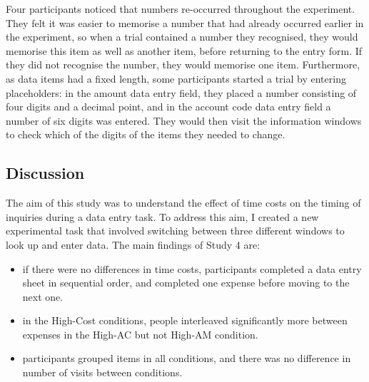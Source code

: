 Four participants noticed that numbers re-occurred throughout the experiment. They felt it was easier to memorise a number that had already occurred earlier in the experiment, so when a trial contained a number they recognised, they would memorise this item as well as another item, before returning to the entry form. If they did not recognise the number, they would memorise one item. Furthermore, as data items had a fixed length, some participants started a trial by entering placeholders: in the amount data entry field, they placed a number consisting of four digits and a decimal point, and in the account code data entry field a number of six digits was entered. They would then visit the information windows to check which of the digits of the items they needed to change. 

\subsection{Discussion}
The aim of this study was to understand the effect of time costs on the timing of inquiries during a data entry task. To address this aim, I created a new experimental task that involved switching between three different windows to look up and enter data. The main findings of Study 4 are:

\begin{itemize}
\item
if there were no differences in time costs, participants completed a data entry sheet in sequential order, and completed one expense before moving to the next one. 
\item
in the High-Cost conditions, people interleaved significantly more between expenses in the High-AC but not High-AM condition. 
\item
participants grouped items in all conditions, and there was no difference in number of visits between conditions.
\end{itemize}


